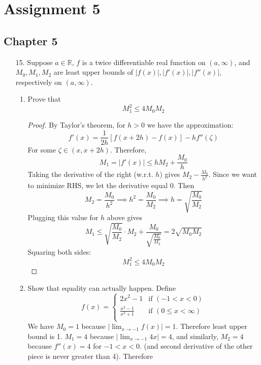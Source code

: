 \documentclass[hidelinks,12pt]{article}
\title{\scalebox{1.5}{Math 723 Homework 5}}
\author{\scalebox{1.5}{Theo Koss}}
\date{November 2024}
\renewcommand{\leq}{\leqslant}
\newcommand{\R}{\mathbb{R}}
\begin{document}
\maketitle
\section*{Assignment 5}
\subsection*{Chapter 5}
\begin{enumerate}
    \item[15.] Suppose \(a\in\R\), \(f\) is a twice differentiable real function on \((a,\infty)\), and \(M_{0},M_{1},M_{2}\) are least upper bounds of \(|f(x)|,|f'(x)|,|f''(x)|\), respectively on \((a,\infty)\). 
        \begin{enumerate}[label=(\alph*).]
            \item Prove that \[
    M_{1}^{2}\leq 4M_{0}M_{2}
    \]
    \begin{proof}
   By Taylor's theorem, for \(h>0\) we have the approximation: \[
       f'(x)=\frac{1}{2h}\left[f(x+2h)-f(x)\right]-hf''(\zeta) 
   \]
  For some \(\zeta\in(x,x+2h)\). Therefore, \[
  M_{1}=|f'(x)|\leq hM_{2}+\frac{M_{0}}{h}
  \]
Taking the derivative of the right (w.r.t. \(h\)) gives \(M_{2}-\frac{M_{0}}{h^{2}}\). Since we want to minimize RHS, we let the derivative equal 0. Then \[
    M_{2}=\frac{M_{0}}{h^{2}}\implies h^{2}=\frac{M_{0}}{M_{2}}\implies h=\sqrt{\frac{M_{0}}{M_{2}}}
\]
Plugging this value for \(h\) above gives 
\[
    M_{1}\leq\sqrt{\frac{M_{0}}{M_{2}}}\cdot M_{2}+\frac{M_{0}}{\sqrt{\frac{M_{0}}{M_{2}}}}=2\sqrt{M_{0}M_{2}}
\]
Squaring both sides:\[
M_{1}^{2}\leq4M_{0}M_{2}
\]
   \end{proof}
            \item Show that equality can actually happen. Define \[
            f(x)=\begin{cases}
            2x^{2}-1 & \text{if }(-1<x<0)\\
             \frac{x^{2}-1}{x^{2}+1}& \text{if }(0\leq x<\infty)\\
            \end{cases}
            \]
           We have \(M_{0}=1\) because \(|\lim_{x\to-1}f(x)|=1\). Therefore least upper bound is 1. \(M_{1}=4\) because \(|\lim_{x\to-1}4x|=4\), and similarly, \(M_{2}=4\) because \(f''(x)=4\) for \(-1<x<0\). (and second derivative of the other piece is never greater than 4). Therefore
           \[
\]
\end{enumerate}
\end{enumerate}
\end{document}
